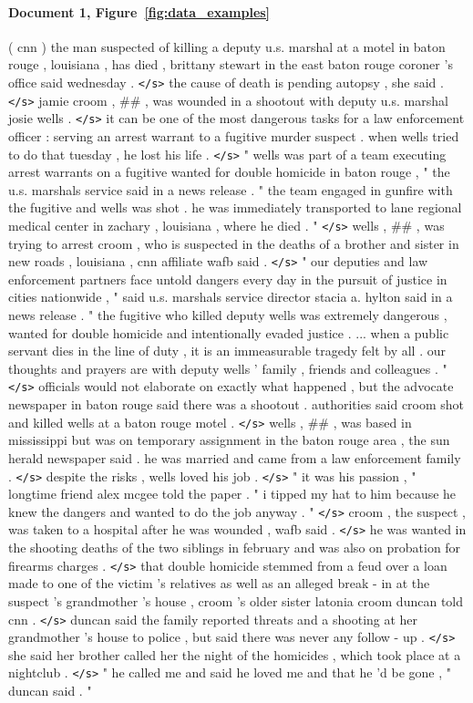 \documentclass[12pt]{report}
\begin{document}
\begin{appendices}
\paragraph{Document 1, Figure~\ref{fig:data_examples}} ( cnn ) the man suspected of killing a deputy u.s. marshal at a motel in baton rouge , louisiana , has died , brittany stewart in the east baton rouge coroner 's office said wednesday . \texttt{</s>} the cause of death is pending autopsy , she said . \texttt{</s>} jamie croom , \#\# , was wounded in a shootout with deputy u.s. marshal josie wells . \texttt{</s>} it can be one of the most dangerous tasks for a law enforcement officer : serving an arrest warrant to a fugitive murder suspect . when wells tried to do that tuesday , he lost his life . \texttt{</s>} " wells was part of a team executing arrest warrants on a fugitive wanted for double homicide in baton rouge , " the u.s. marshals service said in a news release . " the team engaged in gunfire with the fugitive and wells was shot . he was immediately transported to lane regional medical center in zachary , louisiana , where he died . " \texttt{</s>} wells , \#\# , was trying to arrest croom , who is suspected in the deaths of a brother and sister in new roads , louisiana , cnn affiliate wafb said . \texttt{</s>} " our deputies and law enforcement partners face untold dangers every day in the pursuit of justice in cities nationwide , " said u.s. marshals service director stacia a. hylton said in a news release . " the fugitive who killed deputy wells was extremely dangerous , wanted for double homicide and intentionally evaded justice . ... when a public servant dies in the line of duty , it is an immeasurable tragedy felt by all . our thoughts and prayers are with deputy wells ' family , friends and colleagues . " \texttt{</s>} officials would not elaborate on exactly what happened , but the advocate newspaper in baton rouge said there was a shootout . authorities said croom shot and killed wells at a baton rouge motel . \texttt{</s>} wells , \#\# , was based in mississippi but was on temporary assignment in the baton rouge area , the sun herald newspaper said . he was married and came from a law enforcement family . \texttt{</s>} despite the risks , wells loved his job . \texttt{</s>} " it was his passion , " longtime friend alex mcgee told the paper . " i tipped my hat to him because he knew the dangers and wanted to do the job anyway . " \texttt{</s>} croom , the suspect , was taken to a hospital after he was wounded , wafb said . \texttt{</s>} he was wanted in the shooting deaths of the two siblings in february and was also on probation for firearms charges . \texttt{</s>} that double homicide stemmed from a feud over a loan made to one of the victim 's relatives as well as an alleged break - in at the suspect 's grandmother 's house , croom 's older sister latonia croom duncan told cnn . \texttt{</s>} duncan said the family reported threats and a shooting at her grandmother 's house to police , but said there was never any follow - up . \texttt{</s>} she said her brother called her the night of the homicides , which took place at a nightclub . \texttt{</s>} " he called me and said he loved me and that he 'd be gone , " duncan said . " 
\end{appendices}
\end{document}
